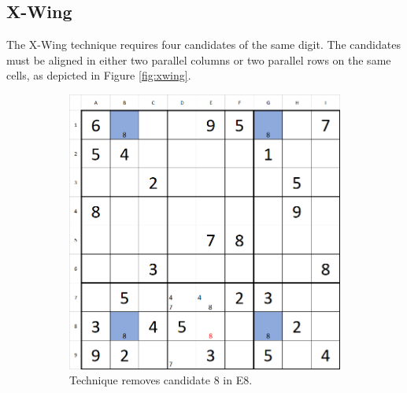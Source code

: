 \documentclass[twoside]{ausarbeitung}
\begin{document}
\subsection{X-Wing} \label{sec:xwing}
The X-Wing technique requires four candidates of the same digit. The candidates must be aligned in either two parallel columns or two parallel rows on the same cells, as depicted in Figure \ref{fig:xwing}. 

\begin{figure}[H]
\centering
\begin{subfigure}[t]{.475\textwidth}
  \centering
  \includegraphics[width=\linewidth]{images/x_wing1.png}
  \caption{Technique removes candidate 8 in E8.}
  \label{fig:xwing1}
\end{subfigure}%
\hfill
\begin{subfigure}[t]{.475\textwidth}
  \centering

\end{subfigure}
\end{figure}
\end{document}

